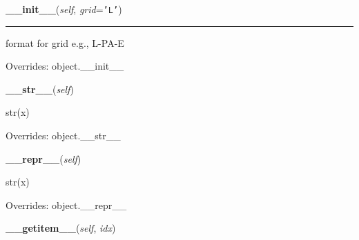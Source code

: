 \hspace{.8\funcindent}\begin{boxedminipage}{\funcwidth}

    \raggedright \textbf{\_\_init\_\_}(\textit{self}, \textit{grid}={\tt \texttt{'}\texttt{L}\texttt{'}})

    \vspace{-1.5ex}

    \rule{\textwidth}{0.5\fboxrule}
\setlength{\parskip}{2ex}
    format for grid e.g., L-PA-E

\setlength{\parskip}{1ex}
      Overrides: object.\_\_init\_\_

    \end{boxedminipage}

    \vspace{0.5ex}

\hspace{.8\funcindent}\begin{boxedminipage}{\funcwidth}

    \raggedright \textbf{\_\_str\_\_}(\textit{self})

\setlength{\parskip}{2ex}
    str(x)

\setlength{\parskip}{1ex}
      Overrides: object.\_\_str\_\_

    \end{boxedminipage}

    \vspace{0.5ex}

\hspace{.8\funcindent}\begin{boxedminipage}{\funcwidth}

    \raggedright \textbf{\_\_repr\_\_}(\textit{self})

\setlength{\parskip}{2ex}
    str(x)

\setlength{\parskip}{1ex}
      Overrides: object.\_\_repr\_\_

    \end{boxedminipage}

    \label{spacepy:radbelt:RBmodel:__getitem__}

    \vspace{0.5ex}

\hspace{.8\funcindent}\begin{boxedminipage}{\funcwidth}

    \raggedright \textbf{\_\_getitem\_\_}(\textit{self}, \textit{idx})

\setlength{\parskip}{2ex}
\setlength{\parskip}{1ex}
    \end{boxedminipage}

